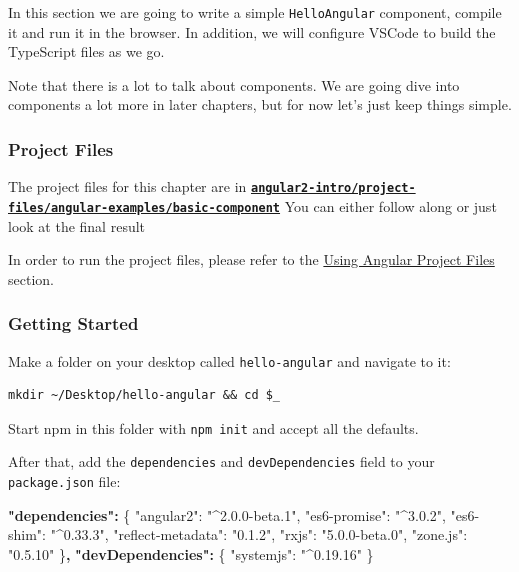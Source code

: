 \documentclass[12pt,]{article}
\newenvironment{Shaded}{}{}
\newcommand{\DataTypeTok}[1]{{#1}}
\newcommand{\StringTok}[1]{\textcolor[rgb]{0.00,0.50,0.50}{{#1}}}
\newcommand{\FunctionTok}[1]{{#1}}
\newcommand{\ErrorTok}[1]{\textcolor[rgb]{1.00,0.00,0.00}{\textbf{{#1}}}}
\begin{document}
In this section we are going to write a simple \texttt{HelloAngular}
component, compile it and run it in the browser. In addition, we will
configure VSCode to build the TypeScript files as we go.

Note that there is a lot to talk about components. We are going dive
into components a lot more in later chapters, but for now let's just
keep things simple.

\subsubsection{Project Files}\label{project-files-1}

The project files for this chapter are in
\textbf{\href{https://github.com/st32lth/angular2-intro/tree/master/project-files/angular-examples/basic-component}{\texttt{angular2-intro/project-files/angular-examples/basic-component}}}
You can either follow along or just look at the final result

In order to run the project files, please refer to the
\protect\hyperlink{using-angular-project-files}{Using Angular Project
Files} section.

\subsubsection{Getting Started}\label{getting-started}

Make a folder on your desktop called \texttt{hello-angular} and navigate
to it:

\begin{verbatim}
mkdir ~/Desktop/hello-angular && cd $_
\end{verbatim}

Start npm in this folder with \texttt{npm\ init} and accept all the
defaults.

After that, add the \texttt{dependencies} and \texttt{devDependencies}
field to your \texttt{package.json} file:

\begin{Shaded}
\begin{Highlighting}[numbers=left,,]
\ErrorTok{"dependencies":} \FunctionTok{\{}
  \DataTypeTok{"angular2"}\FunctionTok{:} \StringTok{"^2.0.0-beta.1"}\FunctionTok{,}
  \DataTypeTok{"es6-promise"}\FunctionTok{:} \StringTok{"^3.0.2"}\FunctionTok{,}
  \DataTypeTok{"es6-shim"}\FunctionTok{:} \StringTok{"^0.33.3"}\FunctionTok{,}
  \DataTypeTok{"reflect-metadata"}\FunctionTok{:} \StringTok{"0.1.2"}\FunctionTok{,}
  \DataTypeTok{"rxjs"}\FunctionTok{:} \StringTok{"5.0.0-beta.0"}\FunctionTok{,}
  \DataTypeTok{"zone.js"}\FunctionTok{:} \StringTok{"0.5.10"}
\FunctionTok{\}}\ErrorTok{,}
\ErrorTok{"devDependencies":} \FunctionTok{\{}
  \DataTypeTok{"systemjs"}\FunctionTok{:} \StringTok{"^0.19.16"}
\FunctionTok{\}}
\end{Highlighting}
\end{Shaded}
\end{document}
